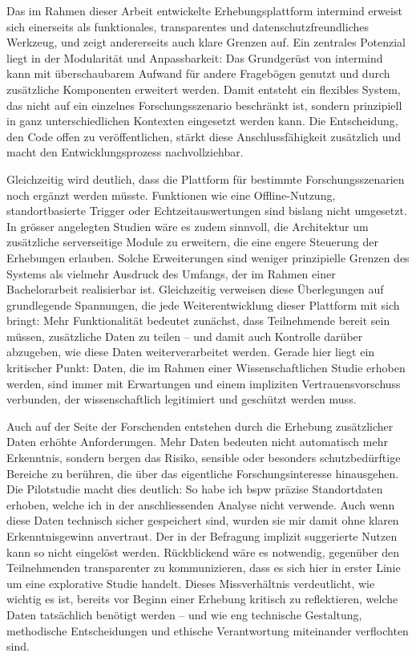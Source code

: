 Das im Rahmen dieser Arbeit entwickelte Erhebungsplattform \gls{intermind} erweist sich einerseits als funktionales, transparentes und datenschutzfreundliches Werkzeug, und zeigt andererseits auch klare Grenzen auf. Ein zentrales Potenzial liegt in der Modularität und Anpassbarkeit: Das Grundgerüst von \gls{intermind} kann mit überschaubarem Aufwand für andere Fragebögen genutzt und durch zusätzliche Komponenten erweitert werden. Damit entsteht ein flexibles System, das nicht auf ein einzelnes Forschungsszenario beschränkt ist, sondern prinzipiell in ganz unterschiedlichen Kontexten eingesetzt werden kann. Die Entscheidung, den Code offen zu veröffentlichen, stärkt diese Anschlussfähigkeit zusätzlich und macht den Entwicklungsprozess nachvollziehbar.

Gleichzeitig wird deutlich, dass die Plattform für bestimmte Forschungsszenarien noch ergänzt werden müsste. Funktionen wie eine Offline-Nutzung, standortbasierte Trigger oder Echtzeitauswertungen sind bislang nicht umgesetzt. In grösser angelegten Studien wäre es zudem sinnvoll, die Architektur um zusätzliche serverseitige Module zu erweitern, die eine engere Steuerung der Erhebungen erlauben. Solche Erweiterungen sind weniger prinzipielle Grenzen des Systems als vielmehr Ausdruck des Umfangs, der im Rahmen einer Bachelorarbeit realisierbar ist. Gleichzeitig verweisen diese Überlegungen auf grundlegende Spannungen, die jede Weiterentwicklung dieser Plattform mit sich bringt: Mehr Funktionalität bedeutet zunächst, dass Teilnehmende bereit sein müssen, zusätzliche Daten zu teilen -- und damit auch Kontrolle darüber abzugeben, wie diese Daten weiterverarbeitet werden. Gerade hier liegt ein kritischer Punkt: Daten, die im Rahmen einer Wissenschaftlichen Studie erhoben werden, sind immer mit Erwartungen und einem impliziten Vertrauensvorschuss verbunden, der wissenschaftlich legitimiert und geschützt werden muss.

Auch auf der Seite der Forschenden entstehen durch die Erhebung zusätzlicher Daten erhöhte Anforderungen. Mehr Daten bedeuten nicht automatisch mehr Erkenntnis, sondern bergen das Risiko, sensible oder besonders schutzbedürftige Bereiche zu berühren, die über das eigentliche Forschungsinteresse hinausgehen. Die Pilotstudie macht dies deutlich: So habe ich \gls{bspw} präzise Standortdaten erhoben, welche ich in der anschliessenden Analyse nicht verwende. Auch wenn diese Daten technisch sicher gespeichert sind, wurden sie mir damit ohne klaren Erkenntnisgewinn anvertraut. Der in der Befragung implizit suggerierte Nutzen kann so nicht eingelöst werden. Rückblickend wäre es notwendig, gegenüber den Teilnehmenden transparenter zu kommunizieren, dass es sich hier in erster Linie um eine explorative Studie handelt. Dieses Missverhältnis verdeutlicht, wie wichtig es ist, bereits vor Beginn einer Erhebung kritisch zu reflektieren, welche Daten tatsächlich benötigt werden -- und wie eng technische Gestaltung, methodische Entscheidungen und ethische Verantwortung miteinander verflochten sind.

